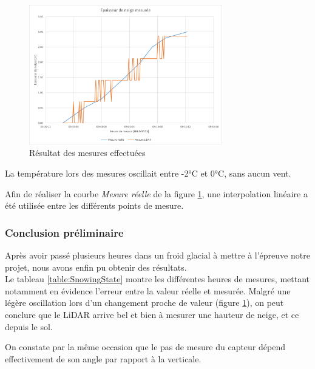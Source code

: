 \begin{figure}[H]
    \centering
    \includegraphics[width=0.75\textwidth]{Images/LiDAR/ReadTests_Results.png}
    \caption{Résultat des mesures effectuées}
    \label{fig:RealTest_Results}
\end{figure}

La température lors des mesures oscillait entre -2°C et 0°C, sans aucun vent.\par 
Afin de réaliser la courbe \emph{Mesure réelle} de la figure \ref{fig:RealTest_Results}, une interpolation
linéaire a été utilisée entre les différents points de mesure.

\subsubsection{Conclusion préliminaire} 

Après avoir passé plusieurs heures dans un froid glacial à mettre à l'épreuve notre projet, nous avons 
enfin pu obtenir des résultats.\\
Le tableau \ref{table:SnowingState} montre les différentes heures de mesures, mettant notamment en évidence
l'erreur entre la valeur réelle et mesurée. Malgré une légère oscillation lors d'un changement proche
de valeur (figure \ref{fig:RealTest_Results}), on peut conclure que le LiDAR arrive bel et bien à mesurer 
une hauteur de neige, et ce depuis le sol.\par 
On constate par la même occasion que le pas de mesure du capteur dépend effectivement de son angle par 
rapport à la verticale.